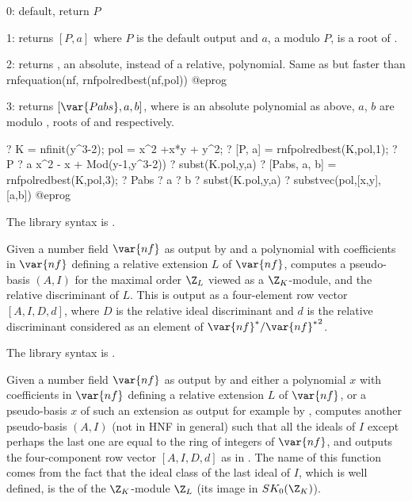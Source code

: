 0: default, return $P$

1: returns $[P,a]$ where $P$ is the default output and $a$,
a  modulo $P$, is a root of .

2: returns , an absolute, instead of a relative, polynomial.
Same as but faster than
\bprog
  rnfequation(nf, rnfpolredbest(nf,pol))
@eprog

3: returns $[\var{Pabs},a,b]$, where  is an absolute polynomial
as above, $a$, $b$ are  modulo , roots of 
and  respectively.

\bprog
? K = nfinit(y^3-2); pol = x^2 +x*y + y^2;
? [P, a] = rnfpolredbest(K,pol,1);
? P
? a
         x^2 - x + Mod(y-1,y^3-2))
? subst(K.pol,y,a)
? [Pabs, a, b] = rnfpolredbest(K,pol,3);
? Pabs
? a
? b
? subst(K.pol,y,a)
? substvec(pol,[x,y],[a,b])
@eprog

The library syntax is .

\label{se:rnfpseudobasis}
Given a number field
$\var{nf}$ as output by  and a polynomial  with
coefficients in $\var{nf}$ defining a relative extension $L$ of $\var{nf}$,
computes a pseudo-basis $(A,I)$ for the maximal order $\Z_L$ viewed as a
$\Z_K$-module, and the relative discriminant of $L$. This is output as a
four-element row vector $[A,I,D,d]$, where $D$ is the relative ideal
discriminant and $d$ is the relative discriminant considered as an element of
$\var{nf}^*/{\var{nf}^*}^2$.

The library syntax is .

\label{se:rnfsteinitz}
Given a number field $\var{nf}$ as
output by  and either a polynomial $x$ with coefficients in
$\var{nf}$ defining a relative extension $L$ of $\var{nf}$, or a pseudo-basis
$x$ of such an extension as output for example by ,
computes another pseudo-basis $(A,I)$ (not in HNF in general) such that all
the ideals of $I$ except perhaps the last one are equal to the ring of
integers of $\var{nf}$, and outputs the four-component row vector $[A,I,D,d]$
as in . The name of this function comes from the fact
that the ideal class of the last ideal of $I$, which is well defined, is the
 of the $\Z_K$-module $\Z_L$ (its image in $SK_0(\Z_K)$).


